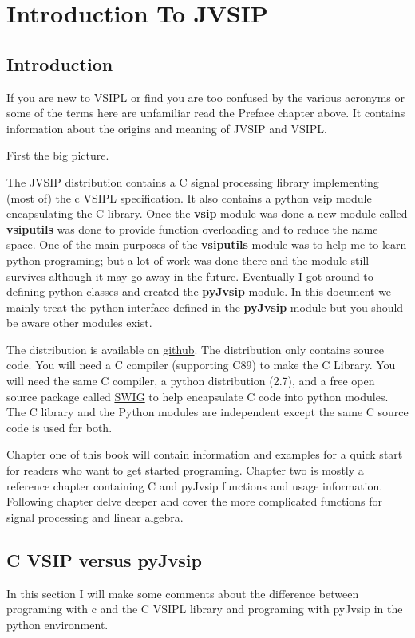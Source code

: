 \chapter{Introduction To JVSIP}
\section*{Introduction}
If you are new to VSIPL or find you are too confused by the various acronyms or some of the terms here are unfamiliar read the Preface chapter above. It contains information about the origins and meaning of JVSIP and VSIPL.

First the big picture.

The JVSIP distribution contains a C signal processing library implementing (most of) the c VSIPL specification. It also contains a python vsip module encapsulating the C library.  Once the {\bf{vsip}} module was done a new module called {\bf{vsiputils}} was done to provide function overloading and to reduce the name space.  One of the main purposes of the {\bf{vsiputils}} module was to help me to learn python programing; but a lot of work was done there and the module still survives although it may go away in the future.  Eventually I got around to defining python classes and created the {\bf{pyJvsip}} module.  In this document we mainly treat the python interface defined in the {\bf{pyJvsip}} module but you should be aware other modules exist.

The distribution is available on \href{https://github.com/rrjudd/jvsip?}{{github}}. The distribution only contains source code. You will need a C compiler (supporting C89) to make the C Library. You will need the same C compiler, a python distribution (2.7), and a free open source package called \href{http://www.swig.org}{SWIG} to help encapsulate C code into python modules. The C library and the Python modules are independent except the same C source code is used for both.

Chapter one of this book will contain information and examples for a quick start for readers who want to get started programing.  Chapter two is mostly a reference chapter containing C and pyJvsip functions and usage information.  Following chapter delve deeper and cover the more complicated functions for signal processing and linear algebra.

\section*{C VSIP versus pyJvsip}
In this section I will make some comments about the difference between programing with c and the C VSIPL library and programing with pyJvsip in the python environment. 

